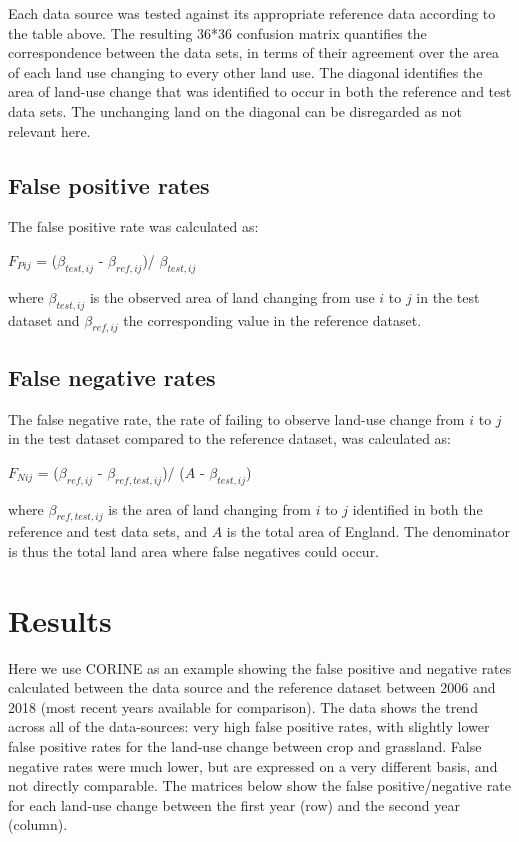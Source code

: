 \documentclass[
]{book}
\begin{document}
Each data source was tested against its appropriate reference data according to the table above. The resulting 36*36 confusion matrix quantifies the correspondence between the data sets, in terms of their agreement over the area of each land use changing to every other land use. The diagonal identifies the area of land-use change that was identified to occur in both the reference and test data sets. The unchanging land on the diagonal can be disregarded as not relevant here.

\hypertarget{false-positive-rates}{%
\subsection{False positive rates}\label{false-positive-rates}}

The false positive rate was calculated as:

\(F_{Pij}\) = (\(\beta_{test,ij}\) - \(\beta_{ref,ij}\))/ \(\beta_{test,ij}\)

where \(\beta_{test,ij}\) is the observed area of land changing from use \(i\) to \(j\) in the test dataset and \(\beta_{ref,ij}\) the corresponding value in the reference dataset.

\hypertarget{false-negative-rates}{%
\subsection{False negative rates}\label{false-negative-rates}}

The false negative rate, the rate of failing to observe land-use change from \(i\) to \(j\) in the test dataset compared to the reference dataset, was calculated as:

\(F_{Nij}\) = (\(\beta_{ref,ij}\) - \(\beta_{ref,test,ij}\))/ (\(A\) - \(\beta_{test,ij}\))

where \(\beta_{ref,test,ij}\) is the area of land changing from \(i\) to \(j\) identified in both the reference and test data sets, and \(A\) is the total area of England. The denominator is thus the total land area where false negatives could occur.

\hypertarget{results-1}{%
\section{Results}\label{results-1}}

Here we use CORINE as an example showing the false positive and negative rates calculated between the data source and the reference dataset between 2006 and 2018 (most recent years available for comparison). The data shows the trend across all of the data-sources: very high false positive rates, with slightly lower false positive rates for the land-use change between crop and grassland. False negative rates were much lower, but are expressed on a very different basis, and not directly comparable. The matrices below show the false positive/negative rate for each land-use change between the first year (row) and the second year (column).
\end{document}
